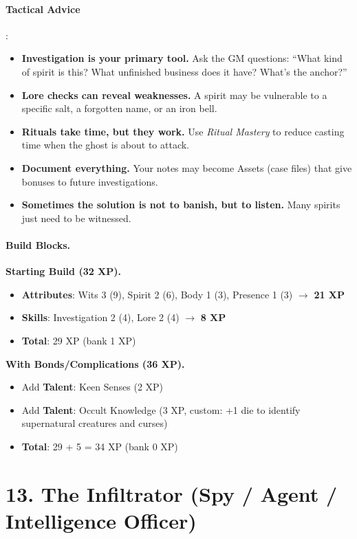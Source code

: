\paragraph{Tactical Advice}:
\begin{itemize}
\item \textbf{Investigation is your primary tool.} Ask the GM questions: ``What kind of spirit is this? What unfinished business does it have? What's the anchor?''
\item \textbf{Lore checks can reveal weaknesses.} A spirit may be vulnerable to a specific salt, a forgotten name, or an iron bell.
\item \textbf{Rituals take time, but they work.} Use \emph{Ritual Mastery} to reduce casting time when the ghost is about to attack.
\item \textbf{Document everything.} Your notes may become Assets (case files) that give bonuses to future investigations.
\item \textbf{Sometimes the solution is not to banish, but to listen.} Many spirits just need to be witnessed.
\end{itemize}

\paragraph{Build Blocks.}
\textbf{Starting Build (32 XP).}
\begin{itemize}
\item \textbf{Attributes}: Wits 3 (9), Spirit 2 (6), Body 1 (3), Presence 1 (3) \(\rightarrow\) \textbf{21 XP}
\item \textbf{Skills}: Investigation 2 (4), Lore 2 (4) \(\rightarrow\) \textbf{8 XP}
\item \textbf{Total}: 29 XP (bank 1 XP)
\end{itemize}
\textbf{With Bonds/Complications (36 XP).}
\begin{itemize}
\item Add \textbf{Talent}: Keen Senses (2 XP)
\item Add \textbf{Talent}: Occult Knowledge (3 XP, custom: +1 die to identify supernatural creatures and curses)
\item \textbf{Total}: 29 + 5 = 34 XP (bank 0 XP)
\end{itemize}

\section{13. The Infiltrator (Spy / Agent / Intelligence Officer)}
\label{sec:concept-infiltrator}

